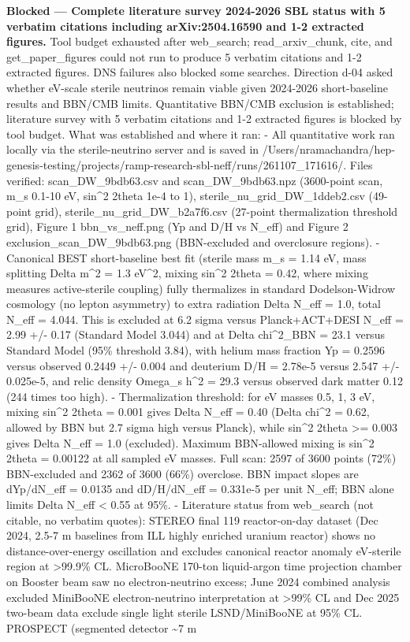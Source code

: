 \documentclass[11pt,a4paper]{article}
\begin{document}
\textbf{Blocked --- Complete literature survey 2024-2026 SBL status with 5 verbatim citations including arXiv:2504.16590 and 1-2 extracted figures.} Tool budget exhausted after web\_search; read\_arxiv\_chunk, cite, and get\_paper\_figures could not run to produce 5 verbatim citations and 1-2 extracted figures. DNS failures also blocked some searches. Direction d-04 asked whether eV-scale sterile neutrinos remain viable given 2024-2026 short-baseline results and BBN/CMB limits. Quantitative BBN/CMB exclusion is established; literature survey with 5 verbatim citations and 1-2 extracted figures is blocked by tool budget. What was established and where it ran: - All quantitative work ran locally via the sterile-neutrino server and is saved in /Users/nramachandra/hep-genesis-testing/projects/ramp-research-sbl-neff/runs/261107\_171616/. Files verified: scan\_DW\_9bdb63.csv and scan\_DW\_9bdb63.npz (3600-point scan, m\_s 0.1-10 eV, sin\textasciicircum{}2 2theta 1e-4 to 1), sterile\_nu\_grid\_DW\_1ddeb2.csv (49-point grid), sterile\_nu\_grid\_DW\_b2a7f6.csv (27-point thermalization threshold grid), Figure 1 bbn\_vs\_neff.png (Yp and D/H vs N\_eff) and Figure 2 exclusion\_scan\_DW\_9bdb63.png (BBN-excluded and overclosure regions). - Canonical BEST short-baseline best fit (sterile mass m\_s = 1.14 eV, mass splitting Delta m\textasciicircum{}2 = 1.3 eV\textasciicircum{}2, mixing sin\textasciicircum{}2 2theta = 0.42, where mixing measures active-sterile coupling) fully thermalizes in standard Dodelson-Widrow cosmology (no lepton asymmetry) to extra radiation Delta N\_eff = 1.0, total N\_eff = 4.044. This is excluded at 6.2 sigma versus Planck+ACT+DESI N\_eff = 2.99 +/- 0.17 (Standard Model 3.044) and at Delta chi\textasciicircum{}2\_BBN = 23.1 versus Standard Model (95\% threshold 3.84), with helium mass fraction Yp = 0.2596 versus observed 0.2449 +/- 0.004 and deuterium D/H = 2.78e-5 versus 2.547 +/- 0.025e-5, and relic density Omega\_s h\textasciicircum{}2 = 29.3 versus observed dark matter 0.12 (244 times too high). - Thermalization threshold: for eV masses 0.5, 1, 3 eV, mixing sin\textasciicircum{}2 2theta = 0.001 gives Delta N\_eff = 0.40 (Delta chi\textasciicircum{}2 = 0.62, allowed by BBN but 2.7 sigma high versus Planck), while sin\textasciicircum{}2 2theta \textgreater{}= 0.003 gives Delta N\_eff = 1.0 (excluded). Maximum BBN-allowed mixing is sin\textasciicircum{}2 2theta = 0.00122 at all sampled eV masses. Full scan: 2597 of 3600 points (72\%) BBN-excluded and 2362 of 3600 (66\%) overclose. BBN impact slopes are dYp/dN\_eff = 0.0135 and dD/H/dN\_eff = 0.331e-5 per unit N\_eff; BBN alone limits Delta N\_eff \textless{} 0.55 at 95\%. - Literature status from web\_search (not citable, no verbatim quotes): STEREO final 119 reactor-on-day dataset (Dec 2024, 2.5-7 m baselines from ILL highly enriched uranium reactor) shows no distance-over-energy oscillation and excludes canonical reactor anomaly eV-sterile region at \textgreater{}99.9\% CL. MicroBooNE 170-ton liquid-argon time projection chamber on Booster beam saw no electron-neutrino excess; June 2024 combined analysis excluded MiniBooNE electron-neutrino interpretation at \textgreater{}99\% CL and Dec 2025 two-beam data exclude single light sterile LSND/MiniBooNE at 95\% CL. PROSPECT (segmented detector \textasciitilde{}7 m 
\end{document}
